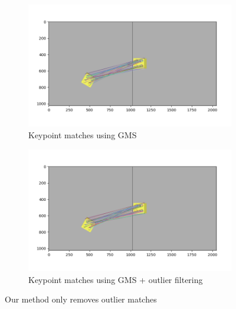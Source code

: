 \begin{figure}[h]
    \centering
    \begin{subfigure}[t]{0.49\textwidth}
        \includegraphics[width=\textwidth]{figures/inliers-gms.png}
        \caption{Keypoint matches using GMS}
        \label{fig:inliers-gms}
    \end{subfigure}
    \hfill
    \begin{subfigure}[t]{0.49\textwidth}
        \includegraphics[width=\textwidth]{figures/inliers-gms+ours.png}
        \caption{Keypoint matches using GMS + outlier filtering}
        \label{fig:inliers-gms+filter}
    \end{subfigure}
    \caption{Our method only removes outlier matches}
    \label{fig:consensus-filtering2}
\end{figure}

